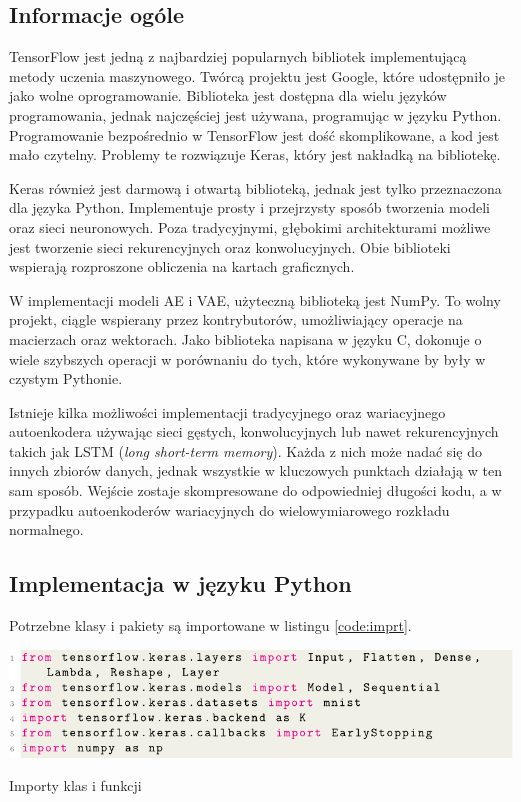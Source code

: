 \documentclass[a4paper,12pt,oneside]{book} %
\begin{document}
\subsection{Informacje ogóle}
TensorFlow jest jedną z najbardziej popularnych bibliotek implementującą metody uczenia maszynowego. Twórcą projektu jest Google, które udostępniło je jako wolne oprogramowanie. Biblioteka jest dostępna dla wielu języków programowania, jednak najczęściej jest używana, programując w języku Python. Programowanie bezpośrednio w TensorFlow jest dość skomplikowane, a kod jest mało czytelny. Problemy te rozwiązuje Keras, który jest nakładką na bibliotekę. 

Keras również jest darmową i otwartą biblioteką, jednak jest tylko przeznaczona dla języka Python. Implementuje prosty i przejrzysty sposób tworzenia modeli oraz sieci neuronowych. Poza tradycyjnymi, głębokimi architekturami możliwe jest tworzenie sieci rekurencyjnych oraz konwolucyjnych. Obie biblioteki wspierają rozproszone obliczenia na kartach graficznych. 

W implementacji modeli AE i VAE, użyteczną biblioteką jest NumPy. To wolny projekt, ciągle wspierany przez kontrybutorów, umożliwiający operacje na macierzach oraz wektorach. Jako biblioteka napisana w języku C, dokonuje o wiele szybszych operacji w porównaniu do tych, które wykonywane by były w czystym Pythonie. 

Istnieje kilka możliwości implementacji tradycyjnego oraz wariacyjnego autoenkodera używając sieci gęstych, konwolucyjnych lub nawet rekurencyjnych takich jak LSTM (\textit{long short-term memory}). Każda z nich może nadać się do innych zbiorów danych, jednak wszystkie w kluczowych punktach działają w ten sam sposób. Wejście zostaje skompresowane do odpowiedniej długości kodu, a w przypadku autoenkoderów wariacyjnych do wielowymiarowego rozkładu normalnego. 
\subsection{Implementacja w języku Python}
Potrzebne klasy i pakiety są importowane w listingu \ref{code:imprt}.
\begin{code}[h!]
	\centering
	\includegraphics[width=\linewidth]{importy.pdf}
	\caption{Importy klas i funkcji}
	\label{code:imprt}
\end{code}
\end{document}
